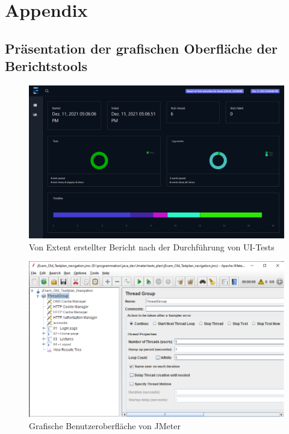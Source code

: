 \chapter{Appendix}

\section{Präsentation der grafischen Oberfläche der Berichtstools}

\begin{figure}[H]
    \centering
    \includegraphics[scale=0.5]{images/extentReport2}
    \caption{Von Extent erstellter Bericht nach der Durchführung von UI-Tests} \label{fig:extent-report}
\end{figure}


\begin{figure}[H]
    \centering
    \includegraphics[scale=0.6]{images/jmeter-ui}
    \caption{Grafische Benutzeroberfläche von JMeter} \label{fig:jmeter}
\end{figure}

